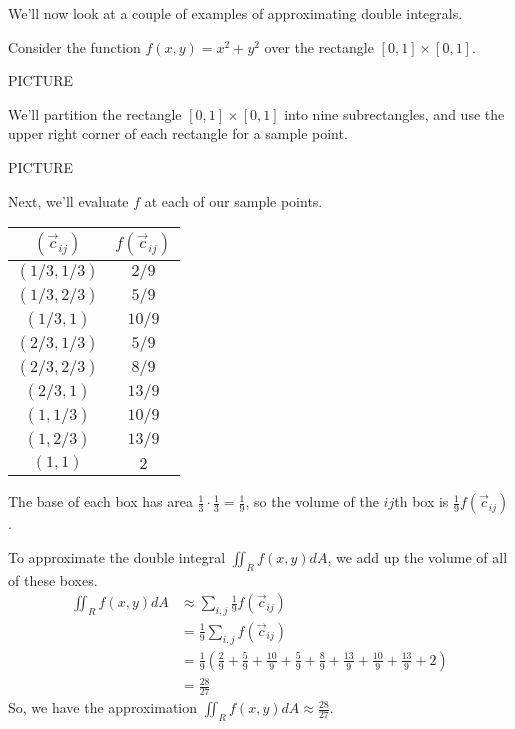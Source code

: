 \documentclass{ximera}
\begin{document}
We'll now look at a couple of examples of approximating double integrals.

\begin{example}
Consider the function $f(x,y) = x^2+y^2$ over the rectangle $[0,1]\times[0,1]$.

PICTURE

We'll partition the rectangle $[0,1]\times [0,1]$ into nine subrectangles, and use the upper right corner of each rectangle for a sample point.

PICTURE

Next, we'll evaluate $f$ at each of our sample points.

\begin{center}
\begin{tabular}{|c|c|}
\hline
$(\vec{c}_{ij})$ & $f(\vec{c}_{ij})$\\
\hline
$(1/3, 1/3)$ & $2/9$\\
$(1/3, 2/3)$ & $5/9$\\
$(1/3, 1)$ & $10/9$\\
$(2/3, 1/3)$ & $5/9$\\
$(2/3, 2/3)$ & $8/9$\\
$(2/3, 1)$ & $13/9$\\
$(1, 1/3)$ & $10/9$\\
$(1, 2/3)$ & $13/9$\\
$(1, 1)$ & $2$\\
\hline
\end{tabular}
\end{center}

The base of each box has area $\frac{1}{3}\cdot \frac{1}{3} = \frac{1}{9}$, so the volume of the $ij$th box is $\frac{1}{9}f(\vec{c}_{ij})$.

To approximate the double integral $\iint_R f(x,y)dA$, we add up the volume of all of these boxes.
\begin{align*}
\iint_R f(x,y)dA &\approx \sum_{i,j} \frac{1}{9}f(\vec{c}_{ij})\\
&= \frac{1}{9}\sum_{i,j} f(\vec{c}_{ij})\\
&= \frac{1}{9}\left(\frac{2}{9} + \frac{5}{9} + \frac{10}{9} + \frac{5}{9} + \frac{8}{9} + \frac{13}{9} + \frac{10}{9} + \frac{13}{9} + 2\right)\\
&= \frac{28}{27}
\end{align*}
So, we have the approximation $\iint_R f(x,y)dA\approx \frac{28}{27}$.
\end{example}
\end{document}
